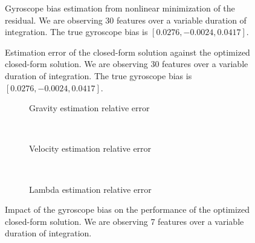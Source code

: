 \documentclass[letterpaper, 10 pt, conference]{ieeeconf}  %
\begin{document}
\begin{figure}
  \centering
  \resizebox{0.7\columnwidth}{!}{}
  \caption{Gyroscope bias estimation from nonlinear minimization of the residual. We are observing 30 features  over a variable duration of integration. The true gyroscope bias is $[0.0276,   -0.0024,    0.0417]$. \label{fig:gBiasEstimate}}
\end{figure}

\begin{figure}
   \centering
   \resizebox{0.7\columnwidth}{!}{}
                \caption{Estimation error of the closed-form solution against the optimized closed-form solution.  We are observing 30 features  over a variable duration of integration. The true gyroscope bias is $[0.0276,   -0.0024,    0.0417]$. \label{fig:optEstimate}}
\end{figure}

\begin{figure}
        \centering

        \begin{subfigure}[b]{0.5\columnwidth}
                \resizebox{\columnwidth}{!}{}
                \caption{Gravity estimation relative error}

        \end{subfigure}%
        ~ %
        \begin{subfigure}[b]{0.5\columnwidth}
                \resizebox{\columnwidth}{!}{}
                \caption{Velocity estimation relative error}

        \end{subfigure}
        ~ %
        \begin{subfigure}[b]{0.5\columnwidth}
                \resizebox{\columnwidth}{!}{}
                \caption{Lambda estimation relative error}

        \end{subfigure}
        \caption{Impact of the gyroscope bias on the performance of the optimized closed-form solution. We are observing 7 features  over a variable duration of integration. \label{fig:biasGyroOpt}}
\end{figure}
\end{document}
